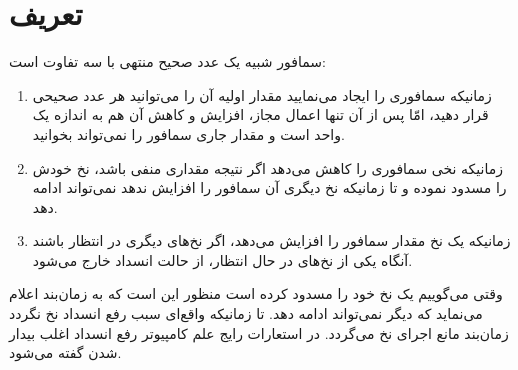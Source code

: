 \documentclass{book}
\begin{document}
\section{تعریف}

    سمافور شبیه یک عدد صحیح منتهی با سه تفاوت است: 

\begin{enumerate}

\item 
    زمانیکه سمافوری را ایجاد می‌نمایید مقدار اولیه آن را می‌توانید هر عدد صحیحی قرار دهید، امّا پس از آن تنها اعمال مجاز، افزایش و کاهش آن هم 
    به اندازه یک واحد است و مقدار جاری سمافور را نمی‌تواند بخوانید. 

\item 
    زمانیکه نخی سمافوری را کاهش می‌دهد اگر نتیجه  مقداری منفی باشد، نخ خودش را مسدود نموده 
    و تا زمانیکه نخ دیگری آن سمافور را افزایش ندهد نمی‌تواند ادامه دهد. 
\item 
    زمانیکه یک نخ مقدار سمافور را افزایش می‌دهد، اگر نخ‌های دیگری در انتظار باشند آنگاه یکی از نخ‌های در حال انتظار،‌ از حالت انسداد خارج می‌شود. 

\end{enumerate}

    وقتی می‌گوییم یک نخ خود را مسدود کرده است %
    منظور این است که به زمان‌بند اعلام می‌نماید که دیگر نمی‌تواند ادامه دهد. 
    تا زمانیکه واقع‌ای سبب رفع انسداد نخ نگردد زمان‌بند مانع اجرای نخ می‌گردد. 
    در استعارات رایج علم کامپیوتر رفع انسداد اغلب بیدار شدن گفته می‌شود.
\end{document}

